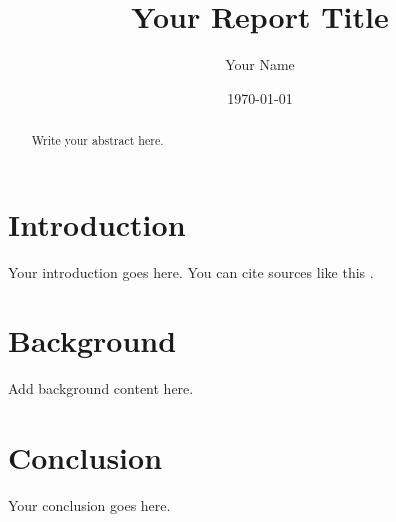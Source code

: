 \documentclass[12pt]{article}
\title{Your Report Title}
\author{Your Name}
\date{\today}
\begin{document}
\maketitle

\begin{abstract}
Write your abstract here.
\end{abstract}

\section{Introduction}
Your introduction goes here. You can cite sources like this \cite{example2024}.

\section{Background}
Add background content here.

\section{Conclusion}
Your conclusion goes here.

\printbibliography
\end{document}

